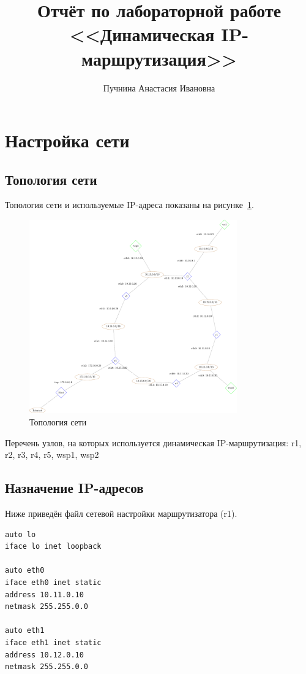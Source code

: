 \documentclass[a4paper,12pt]{article}
\title{Отчёт по лабораторной работе \\ <<Динамическая IP-маршрутизация>>}
\author{Пучнина Анастасия Ивановна}
\begin{document}
\maketitle

\tableofcontents

\section{Настройка сети}

\subsection{Топология сети}

Топология сети и используемые IP-адреса показаны на рисунке~\ref{fig:network}.

\begin{figure}
\centering
\includegraphics[width=0.8\textwidth]{includes/network_gv.pdf}
\caption{Топология сети}
\label{fig:network}
\end{figure}

Перечень узлов, на которых используется динамическая IP-маршрутизация: r1, r2, r3, r4, r5, wsp1, wsp2


\subsection{Назначение IP-адресов}

Ниже приведён файл сетевой настройки  маршрутизатора (r1).

\begin{Verbatim}
auto lo
iface lo inet loopback

auto eth0
iface eth0 inet static
address 10.11.0.10
netmask 255.255.0.0

auto eth1
iface eth1 inet static
address 10.12.0.10
netmask 255.255.0.0
\end{Verbatim}
\end{document}
